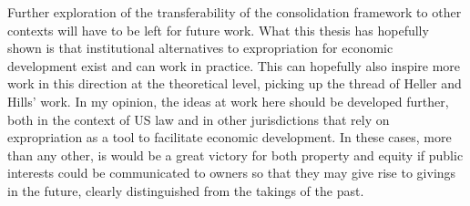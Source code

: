 Further exploration of the transferability of the consolidation framework to other contexts will have to be left for future work. What this thesis has hopefully shown is that institutional alternatives to expropriation for economic development exist and can work in practice. This can hopefully also inspire more work in this direction at the theoretical level, picking up the thread of Heller and Hills' work. In my opinion, the ideas at work here should be developed further, both in the context of US law and in other jurisdictions that rely on expropriation as a tool to facilitate economic development. In these cases, more than any other, is would be a great victory for both property and equity if public interests could be communicated to owners so that they may give rise to givings in the future, clearly distinguished from the takings of the past.



